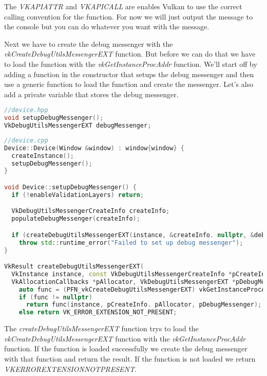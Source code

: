 \documentclass[12pt]{report} \usepackage{preamble}
\begin{document}
The \textit{VKAPI\textunderscore ATTR} and \textit{VKAPI\textunderscore CALL} are enables Vulkan to
use the correct calling convention for the function. For now we will just output the message to the
console but you can do whatever you want with the message.

Next we have to create the debug messenger with the \textit{vkCreateDebugUtilsMessengerEXT} function.
But before we can do that we have to load the function with the \textit{vkGetInstanceProcAddr} function.
We'll start off by adding a function in the constructor that setups the debug messenger and then
use a generic function to load the function and create the messenger. Let's also add a private
variable that stores the debug messenger.

\newpage

\begin{lstlisting}[language=C++]
//device.hpp
void setupDebugMessenger();
VkDebugUtilsMessengerEXT debugMessenger;
\end{lstlisting}

\begin{lstlisting}[language=C++]
//device.cpp
Device::Device(Window &window) : window{window} {
  createInstance();
  setupDebugMessenger();
}

void Device::setupDebugMessenger() {
  if (!enableValidationLayers) return;

  VkDebugUtilsMessengerCreateInfo createInfo;
  populateDebugMessenger(createInfo);

  if (createDebugUtilsMessengerEXT(instance, &createInfo. nullptr, &debugMessenger) != VK_SUCCESS)
    throw std::runtime_error("Failed to set up debug messenger");
}

VkResult createDebugUtilsMessengerEXT(
  VkInstance instance, const VkDebugUtilsMessengerCreateInfo *pCreateInfo.
  VkAllocationCallbacks *pAllocator, VkDebugUtilsMessengerEXT *pDebugMessenger) {
    auto func = (PFN_vkCreateDebugUtilsMessengerEXT) vkGetInstanceProcAddr(instance, "vkCreateDebugUtilsMessengerEXT");
    if (func != nullptr) 
      return func(instance, pCreateInfo. pAllocator, pDebugMessenger);
    else return VK_ERROR_EXTENSION_NOT_PRESENT;
\end{lstlisting}

The \textit{createDebugUtilsMessengerEXT} function trys to load the \textit{vkCreateDebugUtilsMessengerEXT}
function with the \textit{vkGetInstanceProcAddr} function. If the function is loaded successfully
we create the debug messenger with that function and return the result. If the function is not loaded
we return \textit{VK\textunderscore ERROR\textunderscore EXTENSION\textunderscore NOT\textunderscore PRESENT}.
\end{document}
